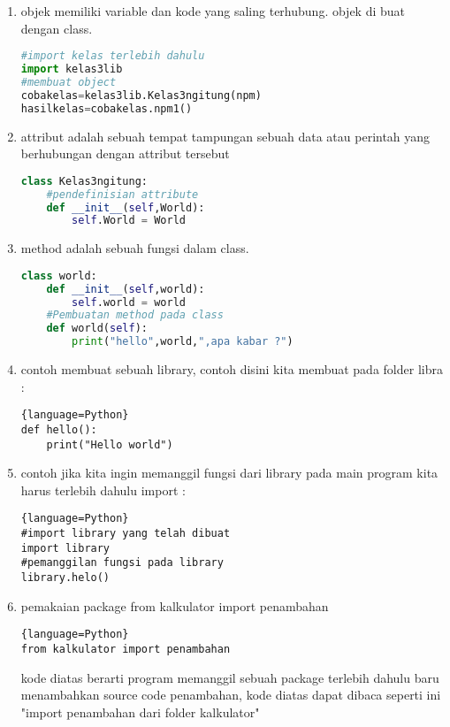 \documentclass[12pt]{article}
\begin{document}
\begin{enumerate}
			\item objek memiliki variable dan kode yang saling terhubung. objek di buat dengan class.
			\begin{lstlisting}[language=Python]
#import kelas terlebih dahulu
import kelas3lib
#membuat object
cobakelas=kelas3lib.Kelas3ngitung(npm) 
hasilkelas=cobakelas.npm1()
			\end{lstlisting}
			
			\item attribut adalah sebuah tempat tampungan sebuah data atau perintah yang berhubungan dengan attribut tersebut
			\begin{lstlisting}[language=Python]
class Kelas3ngitung:
	#pendefinisian attribute
    def __init__(self,World):
        self.World = World
			\end{lstlisting}
			
			\item method adalah sebuah fungsi dalam class.
			\begin{lstlisting}[language=Python]
class world:
    def __init__(self,world):
        self.world = world
    #Pembuatan method pada class
    def world(self):
       	print("hello",world,",apa kabar ?")
			\end{lstlisting}
			
			\item contoh membuat sebuah library, contoh disini kita membuat pada folder libra :
			\begin{lstlisting}{language=Python}
def hello():
    print("Hello world")
			\end{lstlisting}

			\item contoh jika kita ingin memanggil fungsi dari library pada main program kita harus terlebih dahulu import :
			\begin{lstlisting}{language=Python}
#import library yang telah dibuat
import library
#pemanggilan fungsi pada library
library.helo()
			\end{lstlisting}
			
			\item pemakaian package from kalkulator import penambahan
			\begin{lstlisting}{language=Python}
from kalkulator import penambahan
			\end{lstlisting}
kode diatas berarti program memanggil sebuah package terlebih dahulu baru menambahkan source code penambahan, kode diatas dapat dibaca seperti ini "import penambahan dari folder kalkulator"


\end{enumerate}
\end{document}
